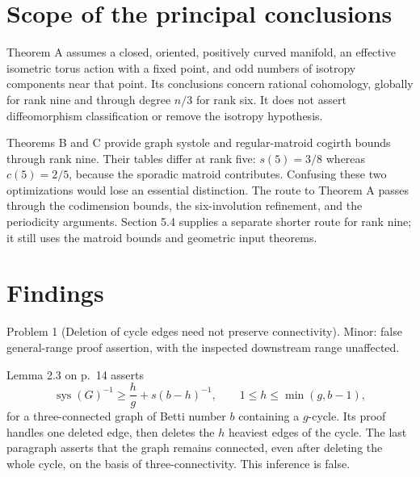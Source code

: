 \documentclass[10pt]{article}
\begin{document}
\section*{Scope of the principal conclusions}
Theorem A assumes a closed, oriented, positively curved manifold, an effective isometric torus action with a fixed point, and odd numbers of isotropy components near that point. Its conclusions concern rational cohomology, globally for rank nine and through degree \(n/3\) for rank six. It does not assert diffeomorphism classification or remove the isotropy hypothesis.\par
Theorems B and C provide graph systole and regular-matroid cogirth bounds through rank nine. Their tables differ at rank five: \(s(5)=3/8\) whereas \(c(5)=2/5\), because the sporadic matroid contributes. Confusing these two optimizations would lose an essential distinction. The route to Theorem A passes through the codimension bounds, the six-involution refinement, and the periodicity arguments. Section 5.4 supplies a separate shorter route for rank nine; it still uses the matroid bounds and geometric input theorems.\par
\section*{Findings}
Problem 1 (Deletion of cycle edges need not preserve connectivity).  Minor: false general-range proof assertion, with the inspected downstream range unaffected.\par
Lemma 2.3 on p. 14 asserts \[\operatorname{sys}(G)^{-1}\geq \frac hg+s(b-h)^{-1},
 \qquad 1\leq h\leq\min(g,b-1),\] for a three-connected graph of Betti number \(b\) containing a \(g\)-cycle. Its proof handles one deleted edge, then deletes the \(h\) heaviest edges of the cycle. The last paragraph asserts that the graph remains connected, even after deleting the whole cycle, on the basis of three-connectivity. This inference is false.\par
\end{document}
